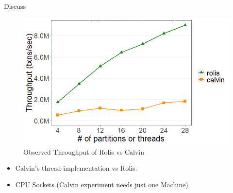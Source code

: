 \documentclass[notes, xcolor=dvipsnames]{beamer}
\begin{document}
    \begin{frame}{Discuss}

        \begin{figure}
            \includegraphics[scale=0.4]{fig12.png}
            \caption{Observed Throughput of Rolis vs Calvin}
        \end{figure}

        \begin{itemize}
            \item Calvin's thread-implementation vs Rolis.
            \item CPU Sockets (Calvin experiment needs just one Machine).
        \end{itemize}


    \end{frame}
\end{document}
